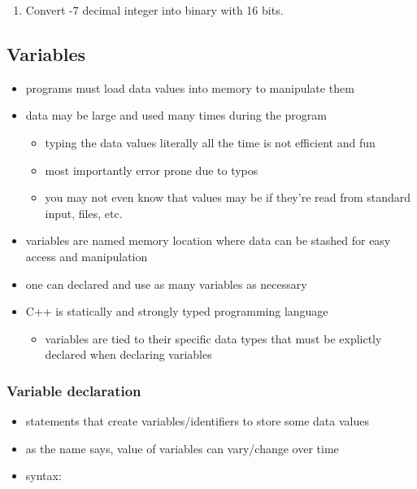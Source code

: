 \documentclass[11pt]{article}
\providecommand{\tightlist}{%
      \setlength{\itemsep}{0pt}\setlength{\parskip}{0pt}}
\begin{document}
    \begin{enumerate}
\def\labelenumi{\arabic{enumi}.}
\setcounter{enumi}{1}
\tightlist
\item
  Convert -7 decimal integer into binary with 16 bits.
\end{enumerate}

    \hypertarget{variables}{%
\subsection{Variables}\label{variables}}

\begin{itemize}
\tightlist
\item
  programs must load data values into memory to manipulate them
\item
  data may be large and used many times during the program

  \begin{itemize}
  \tightlist
  \item
    typing the data values literally all the time is not efficient and
    fun
  \item
    most importantly error prone due to typos
  \item
    you may not even know that values may be if they're read from
    standard input, files, etc.
  \end{itemize}
\item
  variables are named memory location where data can be stashed for easy
  access and manipulation
\item
  one can declared and use as many variables as necessary
\item
  C++ is statically and strongly typed programming language

  \begin{itemize}
  \tightlist
  \item
    variables are tied to their specific data types that must be
    explictly declared when declaring variables
  \end{itemize}
\end{itemize}

\hypertarget{variable-declaration}{%
\subsubsection{Variable declaration}\label{variable-declaration}}

\begin{itemize}
\tightlist
\item
  statements that create variables/identifiers to store some data values
\item
  as the name says, value of variables can vary/change over time
\item
  syntax:
\end{itemize}
\end{document}
